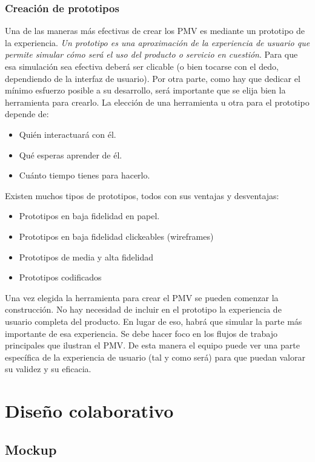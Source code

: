\subsubsection{Creación de prototipos}
Una de las maneras más efectivas de crear los PMV es mediante un prototipo de la experiencia. \textit{Un prototipo es una aproximación de la experiencia de usuario que permite simular cómo será el uso del producto o servicio en cuestión}. Para que esa simulación sea efectiva deberá ser clicable (o bien tocarse con el dedo, dependiendo de la interfaz de usuario).
Por otra parte, como hay que dedicar el mínimo esfuerzo posible a su desarrollo, será importante que se elija bien la herramienta para crearlo. La elección de una herramienta u otra para el prototipo depende de: 
\begin{itemize}
    \item Quién interactuará con él.
    \item Qué esperas aprender de él.
    \item Cuánto tiempo tienes para hacerlo.
\end{itemize}
  
Existen muchos tipos de prototipos, todos con sus ventajas y desventajas:
\begin{itemize}
    \item Prototipos en baja fidelidad en papel.
    \item Prototipos en baja fidelidad clickeables (wireframes)
    \item Prototipos de media y alta fidelidad
    \item Prototipos codificados
\end{itemize}

Una vez elegida la herramienta para crear el PMV se pueden comenzar la construcción. No hay necesidad de incluir en el prototipo la experiencia de usuario completa del producto. En lugar de eso, habrá que simular la parte más importante de esa experiencia. Se debe hacer foco en los flujos de trabajo principales que ilustran el PMV. De esta manera el equipo puede ver una parte específica de la experiencia de usuario (tal y como será) para que puedan valorar su validez y su eficacia.


\section{Diseño colaborativo}

\subsection{Mockup}

